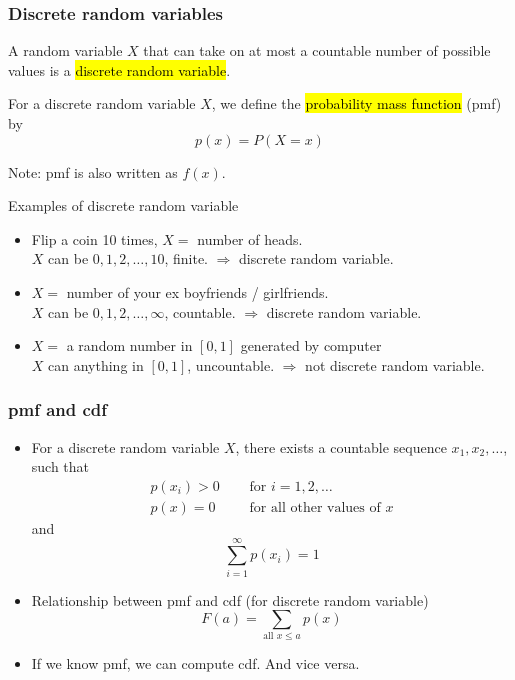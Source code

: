 \documentclass[slidestop,compress,mathserif]{beamer}
\begin{document}
\begin{frame}\frametitle{Discrete random variables}
\begin{defn}
\begin{dinglist}{\DingListSymbolA}
\item A random variable $X$ that can take on at most a countable number of possible values is a
\hl{discrete random variable}.
\pause
\item For a discrete random variable $X$, we define the \hl{probability mass function} (pmf) by
\[ p(x) = P(X = x) \]
\end{dinglist}
\end{defn}
\vspace{-0.1cm}
Note: pmf is also written as $f(x)$.
\pause

Examples of discrete random variable
\begin{itemize}
\item Flip a coin 10 times, $X = $ number of heads.\\
$X$ can be $0, 1, 2, \ldots, 10$, finite. $\Longrightarrow$ discrete random variable.

\pause
\item $X =$ number of your ex boyfriends / girlfriends.\\
$X$ can be $0, 1, 2, \ldots, \infty$, countable. $\Longrightarrow$ discrete random variable.

\pause
\item $X=$ a random number in $[0, 1]$ generated by computer\\
$X$ can anything in $[0, 1]$, uncountable. $\Longrightarrow$ not discrete random variable.


\end{itemize}


\end{frame}


\begin{frame}\frametitle{pmf and cdf}
\begin{itemize}
\item For a discrete random variable $X$, there exists a countable sequence $x_1, x_2, \ldots$, such that
\begin{align*}
p(x_i) > 0 & \quad\text{ for } i = 1, 2, \ldots\\
p(x) = 0 & \quad\text{ for all other values of }x
\end{align*}
\pause
and
\[ \sum_{i=1}^\infty p(x_i) = 1 \]

\pause
\item Relationship between pmf and cdf (for discrete random variable)
\[ F(a) = \sum_{\text{all } x \leq a} p(x)\]

\item If we know pmf, we can compute cdf. And vice versa.

\end{itemize}

\end{frame}
\end{document}
